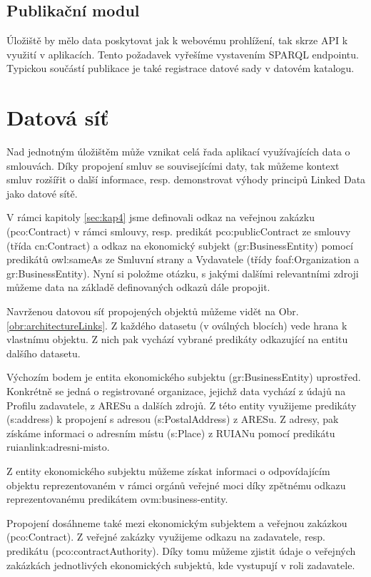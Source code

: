 \subsection*{Publikační modul}

Úložiště by mělo data poskytovat jak k webovému prohlížení, tak skrze API k využití v aplikacích. Tento požadavek vyřešíme vystavením SPARQL endpointu. Typickou součástí publikace je také registrace datové sady v datovém katalogu.

\section{Datová síť}

Nad jednotným úložištěm může vznikat celá řada aplikací využívajících data o smlouvách. Díky propojení smluv se souvisejícími daty, tak můžeme kontext smluv rozšířit o další informace, resp. demonstrovat výhody principů Linked Data jako datové sítě.  

V rámci kapitoly \ref{sec:kap4} jsme definovali odkaz na veřejnou zakázku (pco:Contract) v rámci smlouvy, resp. predikát pco:publicContract ze smlouvy (třída cn:Contract) a odkaz na ekonomický subjekt (gr:BusinessEntity) pomocí predikátů owl:sameAs ze Smluvní strany a Vydavatele (třídy foaf:Organization a gr:BusinessEntity). Nyní si položme otázku, s jakými dalšími relevantními zdroji můžeme data na základě definovaných odkazů dále propojit.

Navrženou datovou síť propojených objektů můžeme vidět na Obr. \ref{obr:architectureLinks}. Z každého datasetu (v oválných blocích) vede hrana k vlastnímu objektu. Z nich pak vychází vybrané predikáty odkazující na entitu dalšího datasetu. 

Výchozím bodem je entita ekonomického subjektu (gr:BusinessEntity) uprostřed. Konkrétně se jedná o registrované organizace, jejichž data vychází z údajů na Profilu zadavatele, z ARESu a dalších zdrojů. Z této entity využijeme predikáty (s:address) k propojení s adresou (s:PostalAddress) z ARESu. Z adresy, pak získáme informaci o adresním místu (s:Place) z RUIANu pomocí predikátu ruianlink:adresni-misto.

Z entity ekonomického subjektu můžeme získat informaci o odpovídajícím objektu reprezentovaném v rámci orgánů veřejné moci díky zpětnému odkazu reprezentovanému predikátem ovm:business-entity. 

Propojení dosáhneme také mezi ekonomickým subjektem a veřejnou zakázkou (pco:Contract). Z veřejné zakázky využijeme odkazu na zadavatele, resp. predikátu (pco:contractAuthority). Díky tomu můžeme zjistit údaje o veřejných zakázkách jednotlivých ekonomických subjektů, kde vystupují v roli zadavatele.

